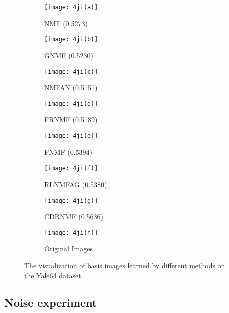 \documentclass[a4paper,fleqn]{cas-sc}
\begin{document}
\begin{figure}[!t]
	\centering
	\begin{subfigure}[b]{.23\textwidth}
		\centering
		\texttt{[image: 4ji(a)]}
		\caption{NMF (0.5273)}\label{subfig:4ji(a)}
	\end{subfigure}
	\begin{subfigure}[b]{.23\textwidth}
		\centering
		\texttt{[image: 4ji(b)]}
		\caption{GNMF (0.5230)}\label{subfig:4ji(b)}
	\end{subfigure}
	\begin{subfigure}[b]{.23\textwidth}
		\centering
		\texttt{[image: 4ji(c)]}
		\caption{NMFAN (0.5151)}\label{subfig:4ji(c)}
	\end{subfigure}
	\begin{subfigure}[b]{.23\textwidth}
		\centering
		\texttt{[image: 4ji(d)]}
		\caption{FRNMF (0.5189)}\label{subfig:4ji(d)}
	\end{subfigure}
	
	\quad
	
	\begin{subfigure}[b]{.23\textwidth}
		\centering
		\texttt{[image: 4ji(e)]}
		\caption{FNMF (0.5394)}\label{subfig:4ji(e)}
	\end{subfigure}
	\begin{subfigure}[b]{.23\textwidth}
		\centering
		\texttt{[image: 4ji(f)]}
		\caption{RLNMFAG (0.5380)}\label{subfig:4ji(f)}
	\end{subfigure}
	\begin{subfigure}[b]{.23\textwidth}
		\centering
		\texttt{[image: 4ji(g)]}
		\caption{CDRNMF (0.5636)}\label{subfig:4ji(g)}
	\end{subfigure}
	\begin{subfigure}[b]{.23\textwidth}
		\centering
		\texttt{[image: 4ji(h)]}
		\caption{Original Images}\label{subfig:4ji(h)}
	\end{subfigure}
	
	\caption{The visualization of basis images learned by different methods on the Yale64 dataset.}\label{fig:4ji}
\end{figure}

\subsection{Noise experiment}
 
\end{document}
